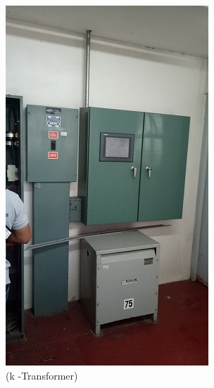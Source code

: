 \begin{figure}
\begin{minipage}[b]{0.22\linewidth}
	\includegraphics[width=\textwidth]{figures/asv_visual_transformer}
	\caption*{(k -Transformer)}
\end{minipage}
	\hspace{0.03cm}
\begin{minipage}[b]{0.22\linewidth}

\end{minipage}
\end{figure}
